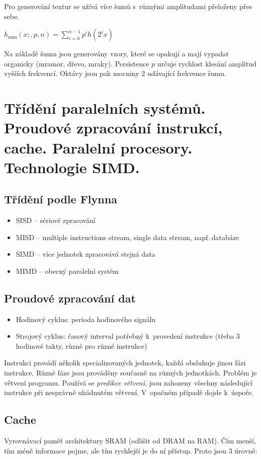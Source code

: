 Pro generování textur se užívá více šumů s~různými amplitudami přeloženy přes sebe.

\(h_\mathrm{sum}(x;,p,n)=\sum_{i=0}^{n-1}p^ih(2^ix)\)

Na základě šumu jsou generovány vzory, které se opakují a mají vypadat organicky (mramor, dřevo, mraky). Persistence \(p\) určuje rychlost klesání amplitud vyšších frekvencí. Oktávy jsou pak mocniny 2 udávající frekvence šumu.

\section{Třídění paralelních systémů. Proudové zpracování instrukcí, cache. Paralelní procesory. Technologie SIMD.}
\subsection{Třídění podle Flynna}
\begin{itemize}
    \item SISD -- sériové zpracování
    \item MISD -- multiple instructions stream, single data stream, např.\,databáze
    \item SIMD -- více jednotek zpracovává stejná data
    \item MIMD -- obecný paralelní systém
\end{itemize}

\subsection{Proudové zpracování dat}

\begin{itemize}
    \item Hodinový cyklus: perioda hodinového signálu
    \item Strojový cyklus: časový interval potřebný k~provedení instrukce (třeba 3 hodinové takty, různé pro různé instrukce)
\end{itemize}

Instrukci provádí několik specializovaných jednotek, každá obsluhuje jinou fázi instrukce. Různé fáze jsou prováděny současně na různých jednotkách. Problém je větvení programu. Používá se \textit{predikce větvení}, jsou zahozeny všechny následující instrukce při nesprávně uhádnutém větvení. V~opačném případě dojde k~úspoře.

\subsection{Cache}
Vyrovnávací paměť architektury SRAM (odlišit od DRAM na RAM). Čím menší, tím méně informace pojme, ale tím rychlejší je do ní přístup. Proto jsou 3 úrovně:

